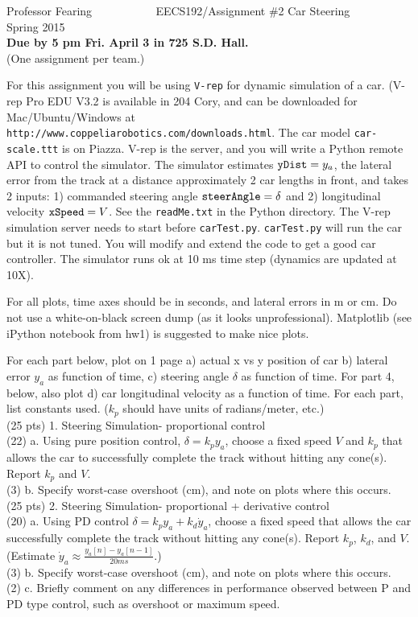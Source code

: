 \documentclass[11pt]{article}
\begin{document}
\thispagestyle{empty}
Professor Fearing ~~~~~~~~~~ EECS192/Assignment \#2 Car Steering~~~~~~~ Spring 2015\\
{\bf Due by 5 pm Fri. April 3 in 725 S.D. Hall.} \\

(One assignment per team.) 

For this assignment you will be using  {\tt V-rep} for dynamic simulation
of a car. (V-rep Pro EDU V3.2 
is available in 204 Cory, and can be downloaded for Mac/Ubuntu/Windows at \\
{\tt http://www.coppeliarobotics.com/downloads.html}. 
The car model {\tt car-scale.ttt} is on Piazza. V-rep is the
server, and you will write a Python remote API to control the simulator.
The simulator estimates ${\tt yDist} = y_a$,
 the lateral error from the track
at a distance approximately 2 car lengths in front, and takes
2 inputs: 1)  commanded steering angle ${\tt steerAngle} = \delta$
and 2) longitudinal velocity ${\tt xSpeed}= V$. 
See the {\tt readMe.txt} in the Python directory. The V-rep simulation
server needs to start before {\tt carTest.py}.
{\tt carTest.py} will run the car but it is not tuned.
You will modify and extend the code to get a good car controller.
The simulator runs ok at 10 ms time step (dynamics are updated at 10X).

For all plots, time axes should be in seconds, and 
lateral errors in m or cm.
Do not use a white-on-black screen dump (as it looks unprofessional).
Matplotlib (see iPython notebook from hw1) is suggested to 
make nice plots.

For each part below, plot on 1 page 
a) actual x vs y position of car b) lateral error 
$y_a$ as function of time, c) steering angle $\delta$ as function of time.
For part 4, below, also plot d) car longitudinal velocity as a function of 
time.
For each part, list constants used. 
($k_p$ should have units of radians/meter, etc.)\\

(25 pts) 1. Steering Simulation- proportional control\\
(22) a. Using pure position control, $\delta = k_p y_a$, choose a fixed speed
$V$ and $k_p$ that allows the car to successfully complete the track
without hitting any cone(s). Report $k_p$ and $V$.\\
(3) b. Specify worst-case overshoot (cm), and note on plots where this occurs.\\

(25 pts) 2. Steering Simulation- proportional + derivative control\\
(20) a. Using PD control $\delta = k_p y_a + k_d \dot y_a$, choose
a fixed speed that allows the car successfully complete the track
without hitting any cone(s). Report $k_p$, $k_d$, and $V$.
(Estimate $\dot y_a \approx \frac{y_a[n] - y_a[n-1]}{20 ms}$.)\\
(3) b. Specify worst-case overshoot (cm), and note on plots where this occurs.\\
(2) c. Briefly comment on any differences in performance observed
between P and PD type control, such as overshoot or maximum speed.\\
\end{document}
